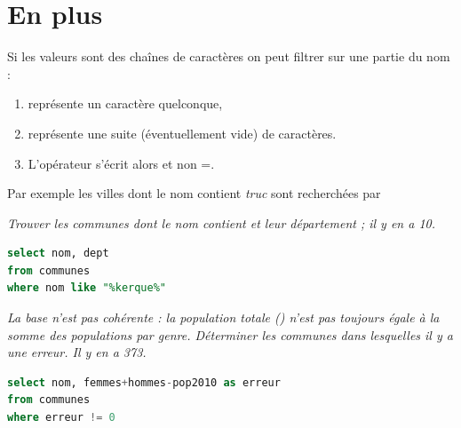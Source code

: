 \section{En plus}
Si les valeurs sont des chaînes de caractères on peut filtrer sur une partie du nom :
\begin{enumerate}
\item \type{\_} représente un caractère quelconque,
\item \type{\%} représente une suite (éventuellement vide) de caractères.
\item L'opérateur s'écrit alors  et non =.
\end{enumerate}
Par exemple les villes dont le nom contient {\it truc} sont recherchées par 
\begin{Exercise}
\textit{Trouver les communes dont le nom contient  et leur département ; il y en a 10.}
\end{Exercise}
\begin{Answer}
\begin{lstlisting}[language=SQL]
select nom, dept
from communes  
where nom like "%kerque%"
\end{lstlisting}
\end{Answer}
\begin{Exercise}
\textit{La base n'est pas cohérente : la population totale () n'est pas toujours égale à la somme des populations par genre. Déterminer les communes dans lesquelles il y a une erreur. Il y en a 373.}
\end{Exercise}
\begin{Answer}
\begin{lstlisting}[language=SQL]
select nom, femmes+hommes-pop2010 as erreur
from communes
where erreur != 0
\end{lstlisting}
\end{Answer}
